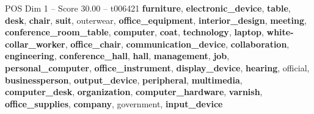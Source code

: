 \begin{textsample}{POS Dim 1 – Score 30.00 – t006421}  \label{ex:f1_pos_013}
\textbf{furniture}, \textbf{electronic\_device}, \textbf{table}, \textbf{desk}, \textbf{chair}, \textbf{suit}, outerwear, \textbf{office\_equipment}, \textbf{interior\_design}, \textbf{meeting}, \textbf{conference\_room\_table}, \textbf{computer}, \textbf{coat}, \textbf{technology}, \textbf{laptop}, \textbf{white-collar\_worker}, \textbf{office\_chair}, \textbf{communication\_device}, \textbf{collaboration}, \textbf{engineering}, \textbf{conference\_hall}, \textbf{hall}, \textbf{management}, \textbf{job}, \textbf{personal\_computer}, \textbf{office\_instrument}, \textbf{display\_device}, \textbf{hearing}, official, \textbf{businessperson}, \textbf{output\_device}, \textbf{peripheral}, \textbf{multimedia}, \textbf{computer\_desk}, \textbf{organization}, \textbf{computer\_hardware}, \textbf{varnish}, \textbf{office\_supplies}, \textbf{company}, government, \textbf{input\_device}

\end{textsample}
